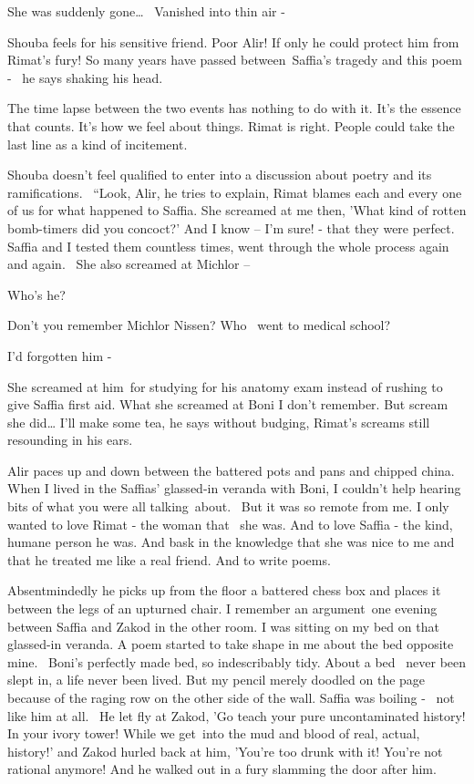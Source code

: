 \documentclass[letterpaper]{article}
\begin{document}
{\textquotedbl}She was suddenly gone{\dots} \ Vanished into thin air -{\textquotedbl}

Shouba feels for his sensitive friend. Poor Alir! If only he could protect him from Rimat's fury! {\textquotedbl}So many
years have passed between~Saffia's tragedy and this poem -{\textquotedbl} \ he says shaking his head. 

{\textquotedbl}The time lapse between the two events has nothing to do with it. It's the essence that counts. It's how
we feel about things. Rimat is right. People could take the last line as a kind of incitement.{\textquotedbl} 

Shouba doesn't feel qualified to enter into a discussion about poetry and its\textcolor{red}{ }ramifications.
\ {}``Look, Alir,{\textquotedbl} he tries to explain, {\textquotedbl}Rimat blames each and every one of us for what
happened to Saffia. She screamed at me then, 'What kind of rotten bomb-timers did you concoct?' And I know -- I'm sure!
- that they were perfect. Saffia and I tested them countless times, went through the whole process again and again.
~She also screamed at Michlor --{\textquotedbl} 

{\textquotedbl}Who's he?{\textquotedbl} 

{\textquotedbl}Don't you remember Michlor Nissen? Who \ went to medical school?{\textquotedbl} 

{\textquotedbl}I'd forgotten him -{\textquotedbl} 

{\textquotedbl}She screamed at him~for studying for his anatomy exam instead of rushing to give Saffia first aid. What
she screamed at Boni I don't remember. But scream she did{\dots} I'll make some tea,{\textquotedbl} he says without
budging, Rimat's screams still resounding in his ears. 

Alir paces up and down between the battered pots and pans and chipped china. {\textquotedbl}When I lived in the Saffias'
glassed-in veranda with Boni, I couldn't help hearing bits of what you were all talking~about.~ But it was so remote
from me. I only wanted to love Rimat - the woman that \ she was. And to love Saffia - the kind, humane person he was.
And bask in the knowledge that she was nice to me and that he treated me like a real friend. And to write
poems.{\textquotedbl} 

Absentmindedly he picks up from the floor a battered chess box and places it between the legs of an upturned chair.
{\textquotedbl}I remember an argument~one evening between Saffia and Zakod in the other room. I was sitting on my bed
on that glassed-in veranda. A poem started to take shape in me about the bed opposite mine.~ Boni's perfectly made bed,
so indescribably tidy. About a bed \ never been slept in, a life never been lived. But my pencil merely doodled on the
page because of the raging row on the other side of the wall. Saffia was boiling - \ not like him at all. \ He let fly
at Zakod, 'Go teach your pure uncontaminated history! In your ivory tower! While we get~into the mud and blood of real,
actual, history!' and Zakod hurled back at him, 'You're too drunk with it! You're not rational anymore!{\textquotedbl}
And he walked out in a fury slamming the door after him. 
\end{document}
